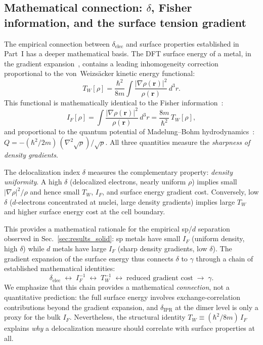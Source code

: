 \documentclass[twocolumn,showpacs,preprintnumbers,amsmath,amssymb,prb]{revtex4-2}
\begin{document}
\subsection{Mathematical connection: $\delta$, Fisher information,
and the surface tension gradient}
\label{sec:fisher}

The empirical connection between $\delta_\mathrm{elec}$ and
surface properties established in Part~I has a deeper
mathematical basis.
The DFT surface energy of a metal, in the gradient
expansion~\cite{Perdew1990}, contains a leading
inhomogeneity correction proportional to the
von~Weizs\"acker kinetic energy functional:
\begin{equation}
  T_W[\rho] = \frac{\hbar^2}{8m}
  \int \frac{|\nabla\rho(\mathbf{r})|^2}{\rho(\mathbf{r})}
  \,d^3r.
  \label{eq:vw}
\end{equation}
This functional is mathematically identical to the
Fisher information~\cite{Nagy2022}:
\begin{equation}
  I_F[\rho] = \int
  \frac{|\nabla\rho(\mathbf{r})|^2}{\rho(\mathbf{r})}
  \,d^3r = \frac{8m}{\hbar^2}\,T_W[\rho],
  \label{eq:fisher}
\end{equation}
and proportional to the quantum potential of
Madelung--Bohm hydrodynamics~\cite{Madelung1926}:
$Q = -(\hbar^2/2m)\,(\nabla^2\!\sqrt{\rho})/\sqrt{\rho}$.
All three quantities measure the \emph{sharpness of
density gradients}.

The delocalization index $\delta$ measures the
complementary property: \emph{density uniformity}.
A high $\delta$ (delocalized electrons, nearly uniform
$\rho$) implies small $|\nabla\rho|^2/\rho$ and hence
small $T_W$, $I_F$, and surface energy gradient cost.
Conversely, low $\delta$ ($d$-electrons concentrated at
nuclei, large density gradients) implies large $T_W$
and higher surface energy cost at the cell boundary.

This provides a mathematical rationale for the empirical
sp/$d$ separation observed in Sec.~\ref{sec:results_solid}:
sp metals have small $I_F$ (uniform density, high $\delta$)
while $d$ metals have large $I_F$ (sharp density gradients,
low $\delta$).
The gradient expansion of the surface energy thus connects
$\delta$ to $\gamma$ through a chain of established
mathematical identities:
\begin{equation}
  \delta_\mathrm{elec} \;\leftrightarrow\;
  I_F^{-1} \;\leftrightarrow\;
  T_W^{-1} \;\leftrightarrow\;
  \text{reduced gradient cost}
  \;\to\; \gamma.
  \label{eq:chain}
\end{equation}
We emphasize that this chain provides a mathematical
\emph{connection}, not a quantitative prediction:
the full surface energy involves exchange-correlation
contributions beyond the gradient expansion,
and $\delta_\mathrm{IPR}$ at the dimer level is only
a proxy for the bulk $I_F$.
Nevertheless, the structural identity
$T_W \equiv (\hbar^2/8m)\,I_F$ explains
\emph{why} a delocalization measure should correlate
with surface properties at all.
\end{document}

